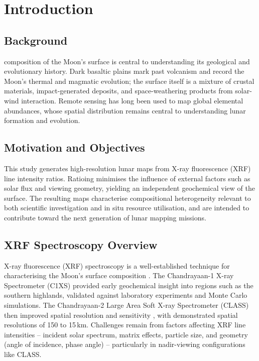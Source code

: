 \documentclass[journal,lettersize]{IEEEtran}
\begin{document}
\section{Introduction}\label{sec:intro}
\subsection{Background}

 composition of the Moon's surface is central to understanding its geological and evolutionary history. Dark basaltic plains mark past volcanism and record the Moon's thermal and magmatic evolution; the surface itself is a mixture of crustal materials, impact-generated deposits, and space-weathering products from solar-wind interaction. Remote sensing has long been used to map global elemental abundances, whose spatial distribution remains central to understanding lunar formation and evolution.

\subsection{Motivation and Objectives}

This study generates high-resolution lunar maps from X-ray fluorescence (XRF) line intensity ratios. Ratioing minimises the influence of external factors such as solar flux and viewing geometry, yielding an independent geochemical view of the surface. The resulting maps characterise compositional heterogeneity relevant to both scientific investigation and in situ resource utilisation, and are intended to contribute toward the next generation of lunar mapping missions.

\subsection{XRF Spectroscopy Overview}
X-ray fluorescence (XRF) spectroscopy is a well-established technique for characterising the Moon's surface composition \cite{Jenkins1999,Beckhoff2006}. The Chandrayaan-1 X-ray Spectrometer (C1XS) provided early geochemical insight into regions such as the southern highlands, validated against laboratory experiments and Monte Carlo simulations. The Chandrayaan-2 Large Area Soft X-ray Spectrometer (CLASS) then improved spatial resolution and sensitivity \cite{Narendranath2020}, with demonstrated spatial resolutions of 150 to 15\,km. Challenges remain from factors affecting XRF line intensities -- incident solar spectrum, matrix effects, particle size, and geometry (angle of incidence, phase angle) -- particularly in nadir-viewing configurations like CLASS.
\end{document}
